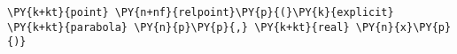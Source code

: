 \begin{Verbatim}[commandchars=\\\{\}]
    \PY{k+kt}{point} \PY{n+nf}{relpoint}\PY{p}{(}\PY{k}{explicit} \PY{k+kt}{parabola} \PY{n}{p}\PY{p}{,} \PY{k+kt}{real} \PY{n}{x}\PY{p}{)}
\end{Verbatim}
